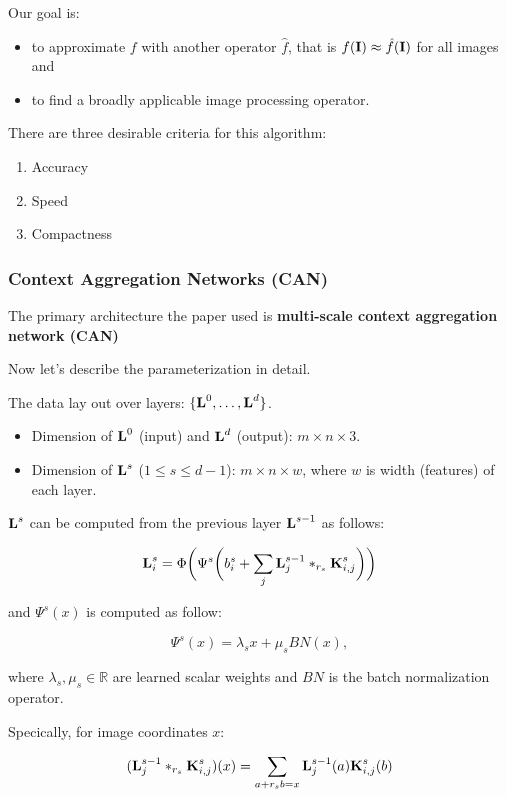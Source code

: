 \documentclass{article}
\newcommand{\tb}{\textbf}
\begin{document}
Our goal is:

\begin{itemize}
    \item to approximate $f$ with another operator $\hat f$, that is $f(\tb I) \approx \hat f(\tb I)$ for all images and
    \item to find a broadly applicable image processing operator.
\end{itemize}

There are three desirable criteria for this algorithm:

\begin{enumerate}
    \item Accuracy
    \item Speed
    \item Compactness
\end{enumerate}

\subsubsection*{Context Aggregation Networks (CAN)}

The primary architecture the paper used is \tb{multi-scale context aggregation network (CAN)}

Now let's describe the parameterization in detail.

The data lay out over layers: $\{\tb L^0, \dots, \tb L^d\}$.

\begin{itemize}
    \item Dimension of $\tb L^0$ (input) and $\tb L^d$ (output): $m \times n \times 3$.
    \item Dimension of $\tb L^s$ ($1 \le s \le d - 1$): $m \times n \times w$, where $w$ is width (features) of each layer.
\end{itemize}

$\tb L^s$ can be computed from the previous layer $\tb L^{s - 1}$ as follows:

$$\tb L_i^s = \Phi\bigg( \Psi^s \bigg(b_i^s + \sum\limits_j \tb L_j^{s - 1} *_{r_s} \tb K_{i, j}^s \bigg)\bigg)$$

and $\Psi^s(x)$ is computed as follow:

$$\Psi^s(x) = \lambda_s x + \mu_s BN(x),$$

where $\lambda_s, \mu_s \in \mathbb R$ are learned scalar weights and $BN$ is the batch normalization operator.

Specically, for image coordinates $x$:

$$(\textbf L_j^{s - 1} *_{r_s} \textbf K_{i,j}^s) (x) = \sum\limits_{a + r_s b = x} \textbf L_j^{s - 1}(a) \textbf K_{i,j}^s(b)$$
\end{document}
